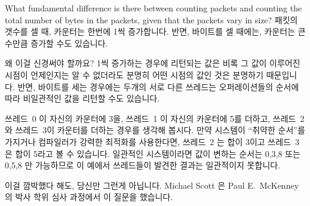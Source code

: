 \begin{enumerate}
	What fundamental difference is there between counting packets
	and counting the total number of bytes in the packets, given
	that the packets vary in size?
	\fi
\QuickA{}
	패킷의 갯수를 셀 때, 카운터는 한번에 1씩 증가합니다.
	반면, 바이트를 셀 때에는, 카운터는 큰 수만큼 증가할 수도 있습니다.

	왜 이걸 신경써야 할까요?
	1씩 증가하는 경우에 리턴되는 값은 비록 그 값이 이루어진 시점이
	언제인지는 알 수 없더라도 분명히 어떤 시점의 값인 것은 분명하기
	때문입니다.
	반면, 바이트를 세는 경우에는 두개의 서로 다른 쓰레드는 오퍼레이션들의
	순서에 따라 비일관적인 값을 리턴할 수도 있습니다.

	쓰레드~0 이 자신의 카운터에 3을, 쓰레드~1 이 자신의 카운터에 5를
	더하고, 쓰레드~2 와 쓰레드~3이 카운터를 더하는 경우를 생각해 봅시다.
	만약 시스템이 ``취약한 순서''를 가지거나 컴파일러가 강력한 최적화를
	사용한다면, 쓰레드~2 는 합이 3이고 쓰레드~3 은 합이 5라고 볼 수
	있습니다.
	일관적인 시스템이라면 값이 변하는 순서는 0,3,8 또는 0,5,8 만 가능하므로
	이 예에서 쓰레드들이 발견한 결과는 일관적이지 못합니다.

	이걸 깜박했다 해도, 당신만 그런게 아닙니다.
	Michael Scott 은 Paul E.~McKenney 의 박사 학위 심사 과정에서 이 질문을
	했습니다.

\end{enumerate}
